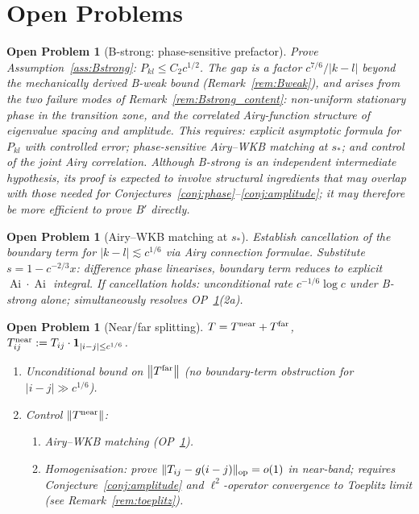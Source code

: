 \documentclass[12pt,a4paper]{article}
\newtheorem{openproblem}[theorem]{Open Problem}
\newcommand{\norm}[1]{\left\|#1\right\|}
\newcommand{\Ai}{\operatorname{Ai}}
\begin{document}
\section{Open Problems}
\label{sec:open}

\begin{openproblem}[B-strong: phase-sensitive prefactor]
\label{op:prefactor}
Prove Assumption~\ref{ass:Bstrong}: $P_{kl}\leq C_2c^{1/2}$.
The gap is a factor $c^{7/6}/|k-l|$ beyond the mechanically
derived B-weak bound (Remark~\ref{rem:Bweak}),
and arises from the two failure modes of Remark~\ref{rem:Bstrong_content}:
non-uniform stationary phase in the transition zone, and
the correlated Airy-function structure of eigenvalue spacing
and amplitude.
This requires: explicit asymptotic formula for $P_{kl}$ with
controlled error; phase-sensitive Airy--WKB matching at $s_*$;
and control of the joint Airy correlation.
Although B-strong is an independent intermediate hypothesis,
its proof is expected to involve structural ingredients
that may overlap with those needed for
Conjectures~\ref{conj:phase}--\ref{conj:amplitude};
it may therefore be more efficient to prove B$'$ directly.
\end{openproblem}

\begin{openproblem}[Airy--WKB matching at $s_*$]
\label{op:bulk_refined}
Establish cancellation of the boundary term for
$|k-l|\lesssim c^{1/6}$ via Airy connection formulae.
Substitute $s=1-c^{-2/3}x$: difference phase linearises,
boundary term reduces to explicit $\Ai\cdot\Ai$ integral.
If cancellation holds: unconditional rate $c^{-1/6}\log c$
under B-strong alone; simultaneously resolves OP~\ref{op:nearfar}(2a).
\end{openproblem}

\begin{openproblem}[Near/far splitting]\label{op:nearfar}
$T=T^{\rm near}+T^{\rm far}$,
$T^{\rm near}_{ij}:=T_{ij}\cdot\mathbf{1}_{|i-j|\leq c^{1/6}}$.
\begin{enumerate}[nosep,label=(\arabic*)]
  \item Unconditional bound on $\norm{T^{\rm far}}$
        (no boundary-term obstruction for $|i-j|\gg c^{1/6}$).
  \item Control $\norm{T^{\rm near}}$:
        \begin{enumerate}[nosep,label=(\alph*)]
          \item Airy--WKB matching (OP~\ref{op:bulk_refined}).
          \item Homogenisation: prove
                $\|T_{ij}-g(i-j)\|_{\rm op}=o(1)$ in near-band;
                requires Conjecture~\ref{conj:amplitude}
                and $\ell^2$-operator convergence to Toeplitz limit
                (see Remark~\ref{rem:toeplitz}).
        \end{enumerate}
\end{enumerate}
\end{openproblem}
\end{document}
